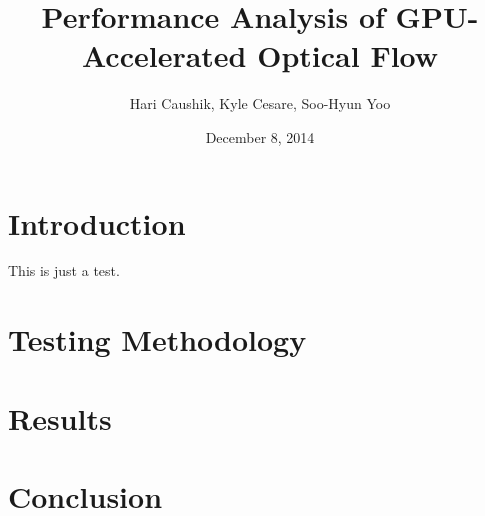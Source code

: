 \documentclass{article}
\title{Performance Analysis of GPU-Accelerated Optical Flow}
\date{December 8, 2014}
\author{Hari Caushik, Kyle Cesare, Soo-Hyun Yoo}
\begin{document}
\maketitle

\newpage

\tableofcontents

\newpage

\section{Introduction}
This is just a test.

\section{Testing Methodology}

\section{Results}

\section{Conclusion}
\end{document}
